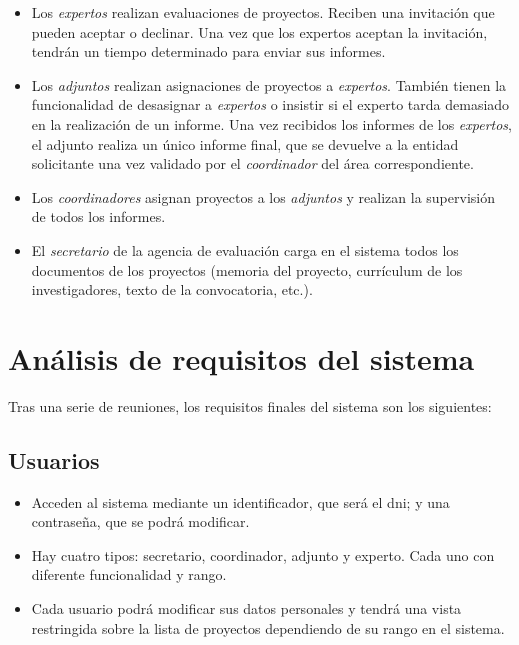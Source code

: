 \documentclass[11pt,a4paper,spanish,twoside]{book}
\begin{document}
\begin{itemize}
\item Los \emph{expertos} realizan evaluaciones de proyectos. Reciben una 
  invitación que pueden aceptar o declinar. Una vez que los expertos aceptan
  la invitación, tendrán un tiempo determinado para enviar sus informes. 
\item Los \emph{adjuntos} realizan asignaciones de proyectos a
  \emph{expertos}. También tienen la funcionalidad de desasignar a
  \emph{expertos} o insistir si el experto tarda demasiado en la realización
  de un informe. Una vez recibidos los informes de los \emph{expertos}, el
  adjunto realiza un único informe final, que se devuelve a la entidad
  solicitante una vez validado por el \emph{coordinador} del área
  correspondiente.     
\item Los \emph{coordinadores} asignan proyectos a los \emph{adjuntos} y
  realizan la supervisión de todos los informes. 
\item El \emph{secretario} de la agencia de evaluación carga en el sistema todos
  los documentos de los proyectos (memoria del proyecto, currículum de los
  investigadores, texto de la convocatoria, etc.). 
\end{itemize}

\section{Análisis de requisitos del sistema}
Tras una serie de reuniones, los requisitos finales del sistema son
los siguientes: 

\subsection{Usuarios}
\begin{itemize}
\item Acceden al sistema mediante un identificador, que será el dni; y una 
contraseña, que se podrá modificar.
\item Hay cuatro tipos: secretario, coordinador, adjunto y experto. Cada uno
  con diferente funcionalidad y rango. 
\item Cada usuario podrá modificar sus datos personales y tendrá una vista
  restringida sobre la lista de proyectos dependiendo de su rango en el 
  sistema.
\end{itemize}
\end{document}
